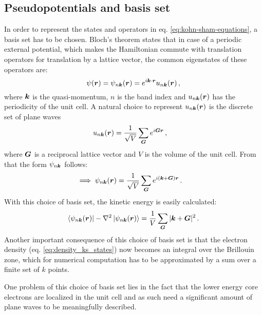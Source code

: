 \documentclass[main.tex]{subfiles}
\begin{document}
\subsection{Pseudopotentials and basis set}\label{sub:theory_basis_set}

In order to represent the states and operators in eq. \ref{eq:kohn-sham-equations}, a basis set has to be chosen.
Bloch's theorem states that in case of a periodic external potential, which makes the Hamiltonian commute with translation operators for translation by a lattice vector, the common eigenstates of these operators are:
\begin{equation}
    \psi (\vb*{r}) = \psi_{n \vb*{k}} (\vb*{r}) = e^{i \vb*{k} \cdot \vb*{r}} u_{n \vb*{k}} (\vb*{r})\,,
\end{equation}
where \(\vb*{k}\) is the quasi-momentum, \(n\) is the band index and \(u_{n \vb*{k}} (\vb*{r})\) has the periodicity of the unit cell.
A natural choice to represent \(u_{n \vb*{k}} (\vb*{r})\) is the discrete set of plane waves
\begin{align}
    u_{n \vb*{k}} (\vb*{r}) &= \frac{1}{\sqrt{V}} \sum_{\vb*{G}} e^{i \vb*{G} \vb*{r}}\,,
\end{align}
where \(\vb*{G}\) is a reciprocal lattice vector and \(V\) is the volume of the unit cell.
From that the form \(\psi_{n \vb*{k}}\) follows:
\begin{align}\label{}
    \implies \psi_{n \vb*{k}} (\vb*{r}) &= \frac{1}{\sqrt{V}} \sum_{\vb*{G}} e^{i (\vb*{k} + \vb*{G}) \vb*{r}}\,.
\end{align}
With this choice of basis set, the kinetic energy is easily calculated:
\begin{equation}
    \bra{\psi_{n \vb*{k}} (\vb*{r})} - \nabla^2 \ket{\psi_{n \vb*{k}} (\vb*{r})} = \frac{1}{V} \sum_{\vb*{G}} \vert \vb*{k} + \vb*{G} \vert^2\,.
\end{equation}
Another important consequence of this choice of basis set is that the electron density (eq. \ref{eq:density_ks_states}) now becomes an integral over the Brillouin zone, which for numerical computation has to be approximated by a sum over a finite set of \(k\) points.

One problem of this choice of basis set lies in the fact that the lower energy core electrons are localized in the unit cell and as such need a significant amount of plane waves to be meaningfully described.
\end{document}
